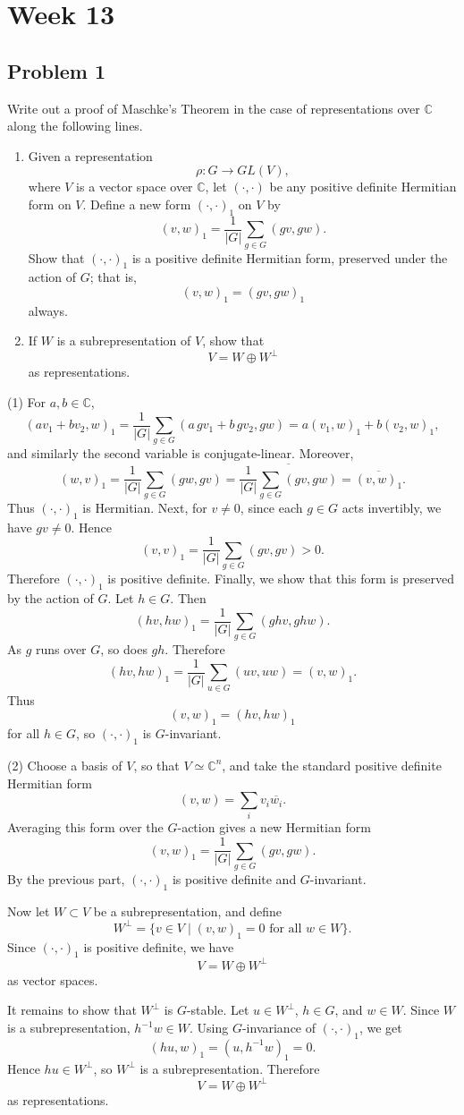 \section{Week 13}
\subsection*{Problem 1}

Write out a proof of Maschke's Theorem in the case of representations over
\(\mathbb{C}\) along the following lines.
\begin{enumerate}
    \item Given a representation
\[
\rho:G\to GL(V),
\]
where \(V\) is a vector space over \(\mathbb{C}\), let \((\cdot,\cdot)\) be any
positive definite Hermitian form on \(V\). Define a new form
\((\cdot,\cdot)_1\) on \(V\) by
\[
(v,w)_1=\frac{1}{|G|}\sum_{g\in G}(gv,gw).
\]
Show that \((\cdot,\cdot)_1\) is a positive definite Hermitian form, preserved
under the action of \(G\); that is,
\[
(v,w)_1=(gv,gw)_1
\]
always.
    \item If \(W\) is a subrepresentation of \(V\), show that
\[
V=W\oplus W^\perp
\]
as representations.
\end{enumerate}
\begin{solution}
(1) For \(a,b\in \mathbb C\),
\[
(av_1+bv_2,w)_1
=\frac{1}{|G|}\sum_{g\in G}(a\,gv_1+b\,gv_2,gw)
=a(v_1,w)_1+b(v_2,w)_1,
\]
and similarly the second variable is conjugate-linear. Moreover,
\[
(w,v)_1
=\frac{1}{|G|}\sum_{g\in G}(gw,gv)
=\overline{\frac{1}{|G|}\sum_{g\in G}(gv,gw)}
=\overline{(v,w)_1}.
\]
Thus \((\cdot,\cdot)_1\) is Hermitian.
Next, for \(v\neq 0\), since each \(g\in G\) acts invertibly, we have \(gv\neq 0\). Hence
\[
(v,v)_1=\frac{1}{|G|}\sum_{g\in G}(gv,gv)>0.
\]
Therefore \((\cdot,\cdot)_1\) is positive definite.
Finally, we show that this form is preserved by the action of \(G\). Let \(h\in G\). Then
\[
(hv,hw)_1
=\frac{1}{|G|}\sum_{g\in G}(ghv,ghw).
\]
As \(g\) runs over \(G\), so does \(gh\). Therefore
\[
(hv,hw)_1
=\frac{1}{|G|}\sum_{u\in G}(uv,uw)
=(v,w)_1.
\]
Thus
\[
(v,w)_1=(hv,hw)_1
\]
for all \(h\in G\), so \((\cdot,\cdot)_1\) is \(G\)-invariant.

(2) Choose a basis of \(V\), so that \(V\simeq \mathbb C^n\), and take the
standard positive definite Hermitian form
\[
(v,w)=\sum_i v_i\overline{w_i}.
\]
Averaging this form over the \(G\)-action gives a new Hermitian form
\[
(v,w)_1=\frac{1}{|G|}\sum_{g\in G}(gv,gw).
\]
By the previous part, \((\cdot,\cdot)_1\) is positive definite and
\(G\)-invariant.

Now let \(W\subset V\) be a subrepresentation, and define
\[
W^\perp=\{v\in V\mid (v,w)_1=0 \text{ for all } w\in W\}.
\]
Since \((\cdot,\cdot)_1\) is positive definite, we have
\[
V=W\oplus W^\perp
\]
as vector spaces.

It remains to show that \(W^\perp\) is \(G\)-stable. Let \(u\in W^\perp\),
\(h\in G\), and \(w\in W\). Since \(W\) is a subrepresentation,
\(h^{-1}w\in W\). Using \(G\)-invariance of \((\cdot,\cdot)_1\), we get
\[
(hu,w)_1=(u,h^{-1}w)_1=0.
\]
Hence \(hu\in W^\perp\), so \(W^\perp\) is a subrepresentation. Therefore
\[
V=W\oplus W^\perp
\]
as representations.
\end{solution}




